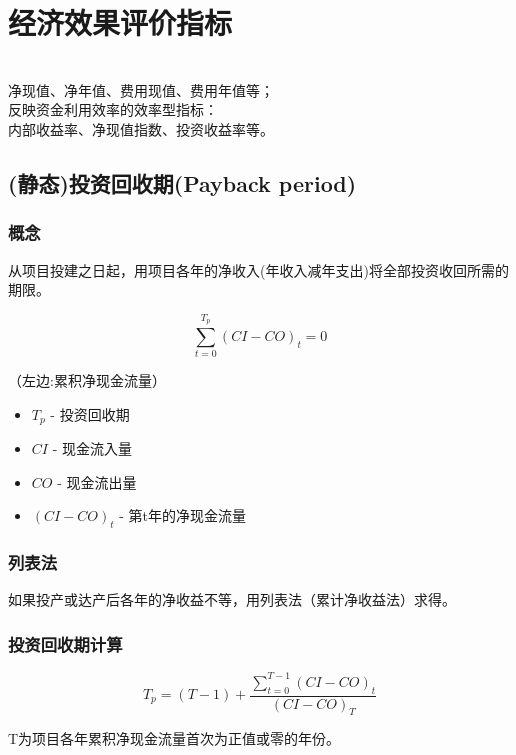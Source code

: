 \chapter{经济效果评价指标}
\\
净现值、净年值、费用现值、费用年值等；\\
反映资金利用效率的效率型指标：\\
内部收益率、净现值指数、投资收益率等。

\section{(静态)投资回收期(Payback period)}
\subsection{概念}

从项目投建之日起，用项目各年的净收入(年收入减年支出)将全部投资收回所需的期限。

\begin{equation*}
\sum_{t=0}^{T_p}{(CI-CO)}_t = 0
\end{equation*}

（左边:累积净现金流量）
\begin{itemize}
    \item $T_p$ - 投资回收期
    \item $CI$ - 现金流入量
    \item $CO$ - 现金流出量
    \item $(CI-CO)_t$ - 第t年的净现金流量
\end{itemize}

\subsection{列表法}
如果投产或达产后各年的净收益不等，用列表法（累计净收益法）求得。

\subsection{投资回收期计算}

\begin{equation}
    T_p = (T - 1)+\frac{\sum_{t=0}^{T-1}{(CI-CO)}_t}{{(CI-CO)}_T}
\end{equation}

T为项目各年累积净现金流量首次为正值或零的年份。

